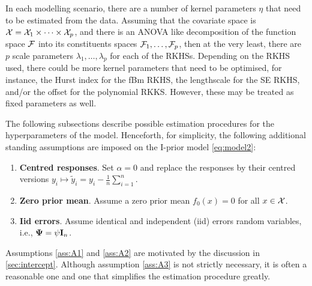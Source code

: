 In each modelling scenario, there are a number of kernel parameters $\eta$ that need to be estimated from the data.
Assuming that the covariate space is ${\mathcal X} = {\mathcal X}_1\times\cdots\times{\mathcal X}_p$, and there is an ANOVA like decomposition of the function space ${\mathcal F}$ into its constituents spaces ${\mathcal F}_1,\dots,{\mathcal F}_p$, then at the very least, there are $p$ scale parameters $\lambda_1,\dots,\lambda_p$ for each of the RKHSs.
Depending on the RKHS used, there could be more kernel parameters that need to be optimised, for instance, the Hurst index for the fBm RKHS, the lengthscale for the SE RKHS, and/or the offset for the polynomial RKKS.
However, these may be treated as fixed parameters as well.

The following subsections describe possible estimation procedures for the hyperparameters of the model.
Henceforth, for simplicity, the following additional standing assumptions are imposed on the I-prior model \eqref{eq:model2}:
\begin{enumerate}[label=A\arabic*,ref=A\arabic*]
  \item \textbf{Centred responses}. Set $\alpha = 0$ and replace the responses by their centred versions $y_i \mapsto \tilde y_i = y_i - \frac{1}{n}\sum_{i=1}^n$. \label{ass:A1}  
  \item \textbf{Zero prior mean}. Assume a zero prior mean $f_0(x) = 0$ for all $x\in{\mathcal X}$. \label{ass:A2} 
  \item \textbf{Iid errors}. Assume identical and independent (iid) errors random variables, i.e., ${\bm\Psi} = \psi{\mathbf I}_n$. \label{ass:A3} 
\end{enumerate}
Assumptions \ref{ass:A1} and \ref{ass:A2} are motivated by the discussion in \autoref{sec:intercept}.
Although assumption \ref{ass:A3} is not strictly necessary, it is often a reasonable one and one that simplifies the estimation procedure greatly.


